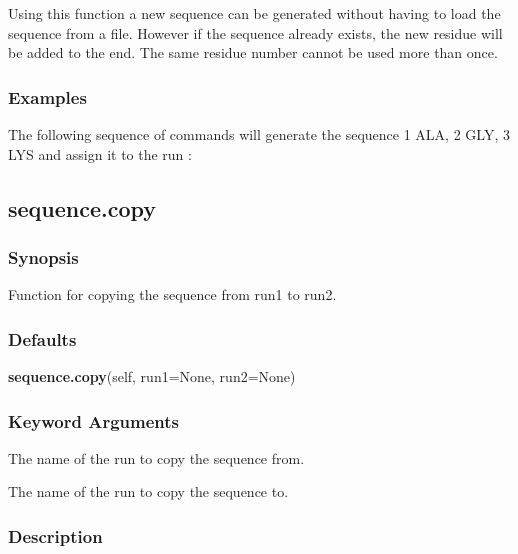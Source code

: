 Using this function a new sequence can be generated without having to load the sequence from
a file.  However if the sequence already exists, the new residue will be added to the end.
The same residue number cannot be used more than once.


\subsubsection{Examples}

The following sequence of commands will generate the sequence 1 ALA, 2 GLY, 3 LYS and assign
it to the run 
:







\newpage

\subsection{sequence.copy}


\subsubsection{Synopsis}

Function for copying the sequence from run1 to run2.

\subsubsection{Defaults}

\textsf{\textbf{sequence.copy}(self, run1=None, run2=None)}


\subsubsection{Keyword Arguments}


  The name of the run to copy the sequence from.

  The name of the run to copy the sequence to.

\subsubsection{Description}

